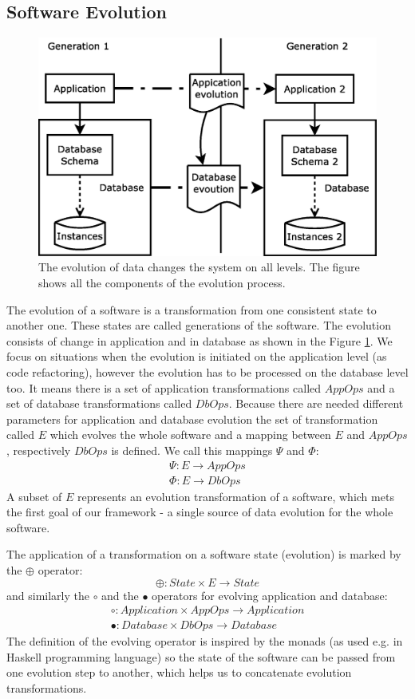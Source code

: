 \documentclass[11pt]{article}
\begin{document}
\subsection{Software Evolution}
\begin{figure}
\centering
	\includegraphics[scale=0.4]{./images/evolution_simple}
	\caption{The evolution of data changes the system on all levels. The figure shows all the components of the evolution process.}
	\label{fig:evolution}
\end{figure}
The evolution of a software is a transformation from one consistent state to another one. These states are called generations of the software. The evolution consists of change in application and in database as shown in the Figure \ref{fig:evolution}. We focus on situations when the evolution is initiated on the application level (as code refactoring), however the evolution has to be processed on the database level too. It means there is a set of application transformations called $AppOps$ and a set of database transformations called $DbOps$. Because there are needed different parameters for application and database evolution the set of transformation called $E$ which evolves the whole software and a mapping between $E$ and $AppOps$, respectively $DbOps$ is defined. We call this mappings $\Psi$ and $\Phi$:
\begin{gather*}
\Psi : E \rightarrow AppOps \\
\Phi : E \rightarrow DbOps
\end{gather*}
A subset of $E$ represents an evolution transformation of a software, which mets the first goal of our framework - a single source of data evolution for the whole software.

The application of a transformation on a software state (evolution) is marked by the $\oplus$ operator:
$$\oplus : State \times E \rightarrow State $$
and similarly the $\circ$ and the $\bullet$ operators for evolving application and database:
\begin{gather*}
\circ : Application \times AppOps \rightarrow Application \\
 \bullet : Database \times DbOps \rightarrow Database
\end{gather*}
The definition of the evolving operator is inspired by the monads (as used e.g. in Haskell programming language) so the state of the software can be passed from one evolution step to another, which helps us to concatenate evolution transformations.
\end{document}
